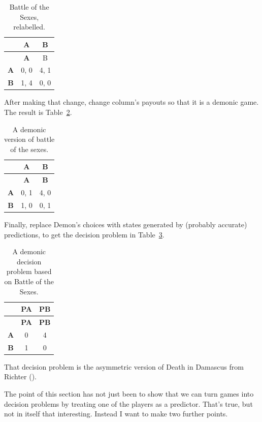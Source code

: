 \documentclass[
  12pt,
  letterpaper,
  DIV=11,
  numbers=noendperiod]{scrreprt}
\begin{document}
\begin{longtable}[]{@{}ccc@{}}
\caption{Battle of the Sexes,
relabelled.}\label{tbl-bach-stravinsky-symmetric}\tabularnewline
\toprule\noalign{}
& \textbf{A} & B \\
\midrule\noalign{}
\endfirsthead
\toprule\noalign{}
& \textbf{A} & B \\
\midrule\noalign{}
\endhead
\bottomrule\noalign{}
\endlastfoot
\textbf{A} & 0, 0 & 4, 1 \\
\textbf{B} & 1, 4 & 0, 0 \\
\end{longtable}

After making that change, change column's payouts so that it is a
demonic game. The result is Table~\ref{tbl-bach-demon}.

\begin{longtable}[]{@{}ccc@{}}
\caption{A demonic version of battle of the
sexes.}\label{tbl-bach-demon}\tabularnewline
\toprule\noalign{}
& \textbf{A} & \textbf{B} \\
\midrule\noalign{}
\endfirsthead
\toprule\noalign{}
& \textbf{A} & \textbf{B} \\
\midrule\noalign{}
\endhead
\bottomrule\noalign{}
\endlastfoot
\textbf{A} & 0, 1 & 4, 0 \\
\textbf{B} & 1, 0 & 0, 1 \\
\end{longtable}

Finally, replace Demon's choices with states generated by (probably
accurate) predictions, to get the decision problem in
Table~\ref{tbl-asymm-death-damascus}.

\begin{longtable}[]{@{}ccc@{}}
\caption{A demonic decision problem based on Battle of the
Sexes.}\label{tbl-asymm-death-damascus}\tabularnewline
\toprule\noalign{}
& \textbf{PA} & \textbf{PB} \\
\midrule\noalign{}
\endfirsthead
\toprule\noalign{}
& \textbf{PA} & \textbf{PB} \\
\midrule\noalign{}
\endhead
\bottomrule\noalign{}
\endlastfoot
\textbf{A} & 0 & 4 \\
\textbf{B} & 1 & 0 \\
\end{longtable}

That decision problem is the asymmetric version of Death in Damascus
from Richter ().

The point of this section has not just been to show that we can turn
games into decision problems by treating one of the players as a
predictor. That's true, but not in itself that interesting. Instead I
want to make two further points.
\end{document}

